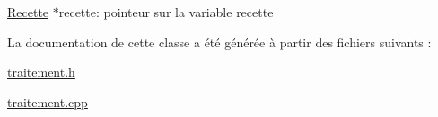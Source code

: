 \hyperlink{classRecette}{Recette} $\ast$recette\+: pointeur sur la variable recette 

La documentation de cette classe a été générée à partir des fichiers suivants \+:\begin{DoxyCompactItemize}
\item 
\hyperlink{traitement_8h}{traitement.\+h}\item 
\hyperlink{traitement_8cpp}{traitement.\+cpp}\end{DoxyCompactItemize}
